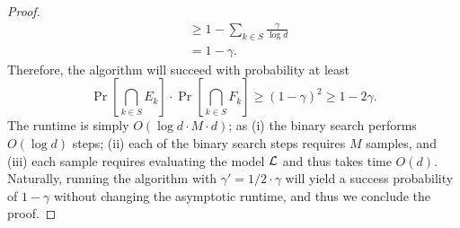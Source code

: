 \begin{proof}
\begin{align*}
	&\geq 1 - \sum_{k \in S} \frac{\gamma}{\log d}\\
	&= 1 - \gamma.
\end{align*}
Therefore, the algorithm will succeed with probability at least 
\[ 
	\Pr\left[\bigcap_{k \in S} E_k\right] \cdot \Pr\left[\bigcap_{k \in S} F_k\right] \geq (1-\gamma)^2 \geq 1-2\gamma.
\]
The runtime is simply
$O(\log d \cdot M \cdot d  )$; as (i) the binary search performs $O(\log d)$ steps; (ii) each of the binary search steps requires $M$ samples, and (iii) each sample requires evaluating the model $\mathcal{L}$ and thus takes time $O(d)$. Naturally, running the algorithm with $\gamma' = 1/2 \cdot \gamma$ will yield a success probability of $1-\gamma$ without changing the asymptotic runtime, and thus we conclude the proof.




\end{proof}

